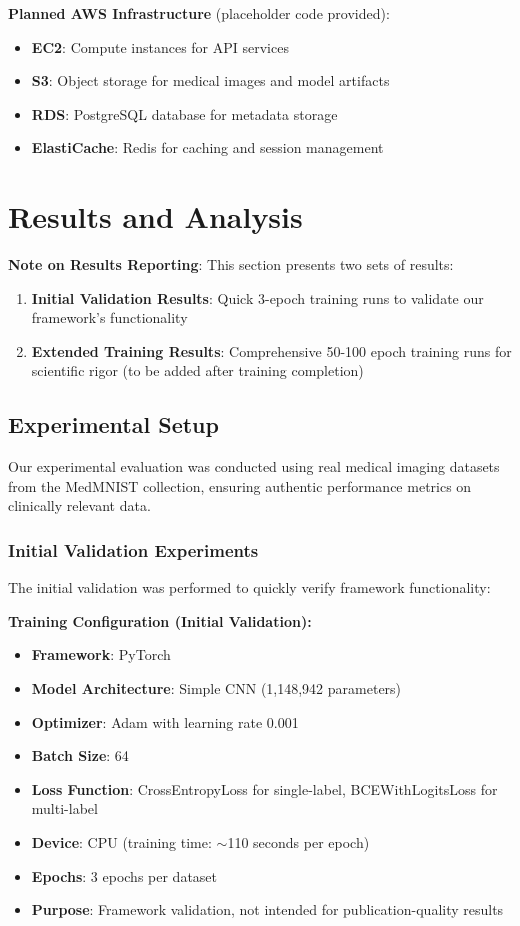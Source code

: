 \documentclass[12pt,a4paper]{article}
\begin{document}
\textbf{Planned AWS Infrastructure} (placeholder code provided):
\begin{itemize}
    \item \textbf{EC2}: Compute instances for API services
    \item \textbf{S3}: Object storage for medical images and model artifacts
    \item \textbf{RDS}: PostgreSQL database for metadata storage
    \item \textbf{ElastiCache}: Redis for caching and session management
\end{itemize}

\section{Results and Analysis}

\textbf{Note on Results Reporting}: This section presents two sets of results:
\begin{enumerate}
    \item \textbf{Initial Validation Results}: Quick 3-epoch training runs to validate our framework's functionality
    \item \textbf{Extended Training Results}: Comprehensive 50-100 epoch training runs for scientific rigor (to be added after training completion)
\end{enumerate}

\subsection{Experimental Setup}

Our experimental evaluation was conducted using real medical imaging datasets from the MedMNIST collection, ensuring authentic performance metrics on clinically relevant data.

\subsubsection{Initial Validation Experiments}

The initial validation was performed to quickly verify framework functionality:

\textbf{Training Configuration (Initial Validation):}
\begin{itemize}
    \item \textbf{Framework}: PyTorch
    \item \textbf{Model Architecture}: Simple CNN (1,148,942 parameters)
    \item \textbf{Optimizer}: Adam with learning rate 0.001
    \item \textbf{Batch Size}: 64
    \item \textbf{Loss Function}: CrossEntropyLoss for single-label, BCEWithLogitsLoss for multi-label
    \item \textbf{Device}: CPU (training time: $\sim$110 seconds per epoch)
    \item \textbf{Epochs}: 3 epochs per dataset
    \item \textbf{Purpose}: Framework validation, not intended for publication-quality results
\end{itemize}
\end{document}
